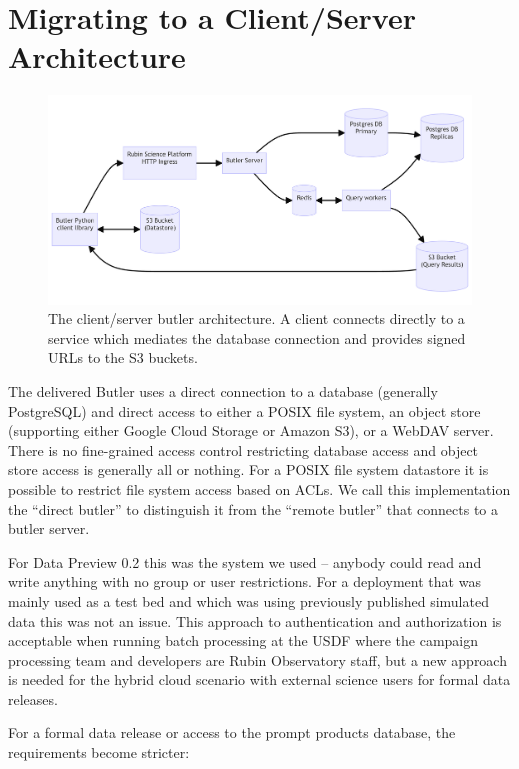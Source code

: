 \section{Migrating to a Client/Server Architecture}

\begin{figure}
\centering
\includegraphics[width=\textwidth]{butler-client-server}
\caption{The client/server butler architecture. A client connects directly to a service which mediates the database connection and provides signed URLs to the S3 buckets.\label{fig:server}}
\end{figure}

The delivered Butler uses a direct connection to a database (generally PostgreSQL) and direct access to either a POSIX file system, an object store (supporting either Google Cloud Storage or Amazon S3), or a WebDAV server.
There is no fine-grained access control restricting database access and object store access is generally all or nothing.
For a POSIX file system datastore it is possible to restrict file system access based on ACLs.
We call this implementation the ``direct butler'' to distinguish it from the ``remote butler'' that connects to a butler server.

For Data Preview 0.2 \cite{RTN-041} this was the system we used -- anybody could read and write anything with no group or user restrictions.
For a deployment that was mainly used as a test bed and which was using previously published simulated data this was not an issue.
This approach to authentication and authorization is acceptable when running batch processing at the USDF where the campaign processing team and developers are Rubin Observatory staff, but a new approach is needed for the hybrid cloud scenario with external science users for formal data releases.

For a formal data release or access to the prompt products database, the requirements become stricter:

